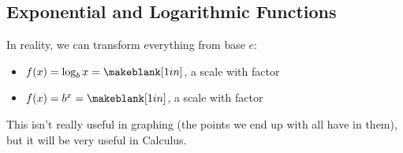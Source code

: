 \subsection{Exponential and Logarithmic Functions} 
\begin{Note}
In reality, we can transform everything from base $e$:
\begin{itemize}
\item $f(x)=\log_b x = \makeblank[1in]$, a \makeblank[1in] scale with factor \makeblanksmall
\item $f(x)=b^x = \makeblank[1in]$, a \makeblank[1in] scale with factor \makeblanksmall
\end{itemize}
This isn't really useful in graphing (the points we end up with all have \makeblanksmall in them), but it will be very useful in Calculus.
\end{Note}